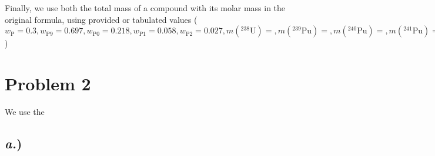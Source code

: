 \documentclass{article}
\begin{document}
Finally, we use both the total mass of a compound with its molar mass in the original formula, using provided or tabulated values ($w_{\text{P}} = 0.3, w_{\text{P}9}=0.697, w_{\text{P}0}=0.218, w_{\text{P}1}=0.058, w_{\text{P}2}=0.027, m(^{238}\text{U})=, m(^{239}\text{Pu})=, m(^{240}\text{Pu})=, m(^{241}\text{Pu})=, m(^{242}\text{Pu})=, m(\text{O})= $)



\section*{Problem 2}

We use the


\subsection*{\textit{a.})}
\end{document}
